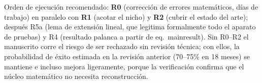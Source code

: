 \documentclass[12pt, a4paper]{article}
\begin{document}
Orden de ejecución recomendado: \textbf{R0} (corrección de errores
matemáticos, días de trabajo) en paralelo con \textbf{R1} (acotar el nicho)
y \textbf{R2} (cubrir el estado del arte); después R5a (lema de extensión
lineal, que legitima formalmente todo el aparato de pruebas) y R4 (resultado
palanca a partir de eq.~mainresult). Sin R0--R2 el manuscrito corre el
riesgo de ser rechazado sin revisión técnica; con ellos, la probabilidad de
éxito estimada en la revisión anterior (70--75\% en 18 meses) se mantiene e
incluso mejora ligeramente, porque la verificación confirma que el núcleo
matemático no necesita reconstrucción.

\printbibliography[title={Referencias --- Estado del arte a incorporar}]
\end{document}
